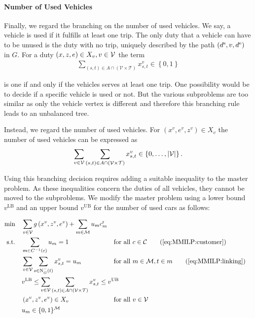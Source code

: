 \paragraph{Number of Used Vehicles} \parfill

Finally, we regard the branching on the number of used vehicles. We say, a vehicle is used if it fulfills at least one trip. The only duty that a vehicle can have to be unused is the duty with no trip, uniquely described by the path ${\left(d^{\operatorname{s}},v,d^{\operatorname{e}}\right)}$ in $G$. For a duty $(x,z,e)\in X_v, v\in\mathcal{V}$ the term
\begin{align*}
	\sum_{(s,t)\in A\cap\left(\mathcal{V}\times\mathcal{T}\right)} x^v_{s,t}\in\left\{0,1\right\}
\end{align*}

is one if and only if the vehicles serves at least one trip. One possibility would be to decide if a specific vehicle is used or not. But the various subproblems are too similar as only the vehicle vertex is different and therefore this branching rule leads to an unbalanced tree.

Instead, we regard the number of used vehicles. For ${\left(x^v,e^v,z^v\right)\in X_v}$ the number of used vehicles can be expressed as
\begin{align*}
	\sum_{v\in\mathcal{V}}\sum_{(s,t)\in A\cap\left(\mathcal{V}\times\mathcal{T}\right)} x^v_{s,t}\in\left\{0,\dots,\vert\mathcal{V}\vert\right\}.
\end{align*}

Using this branching decision requires adding a suitable inequality to the master problem. As these inequalities concern the duties of all vehicles, they cannot be moved to the subproblems. We modify the master problem using a lower bound $v^{\operatorname{LB}}$ and an upper bound $v^{\operatorname{UB}}$ for the number of used cars as follows:

\begin{align}
	\min \quad & \sum_{v\in\mathcal{V}}g\left(x^v,z^v,e^v\right) + \sum_{m\in\mathcal{M}} u_m \croute_m \nonumber \\
	\text{s.t.} \quad & \sum_{m\in C^{-1}(c)} u_m = 1 && \text{for all } c\in\mathcal{C} \tag{\ref{eq:MMILP:customer}} \\
	& \sum_{v\in\mathcal{V}}\sum_{s\in\Nin(t)}x^v_{s,t} = u_m && \text{for all } m\in\mathcal{M},t\in m \tag{\ref{eq:MMILP:linking}} \\
	& \omit\rlap{$\displaystyle{v^{\operatorname{LB}} \leq \sum_{\vinV}\sum_{(s,t)\in A\cap\left(\mathcal{V}\times\mathcal{T}\right)} x^v_{s,t} \leq v^{\operatorname{UB}}}$} \label{eq:MMILP:used_vehicles} \\
	& \left(x^v,z^v,e^v\right)\in X_v && \text{for all } v\in\mathcal{V} \nonumber \\
	& u_m\in\{0,1\}^{\mathcal{M}} \nonumber
\end{align}

